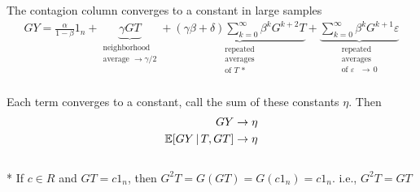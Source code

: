 \documentclass[aspectratio=169]{beamer}
\theoremstyle{remark}
\begin{document}
\begin{frame}{The contagion column converges to a constant in large samples}
    \begin{align*}
        GY = 
        \frac{\alpha}{1 - \beta} 1_n + 
        \underbrace{\gamma G T}_{\substack{\text{neighborhood}                                              \\ \text{average } \to \gamma / 2}} + 
        \underbrace{(\gamma \beta + \delta) \sum_{k=0}^\infty \beta^k G^{k+2} T}_{\substack{\text{repeated} \\ \text{averages} \\ \text{of $T$ *}}} +
        \underbrace{\sum_{k=0}^\infty \beta^k G^{k+1} \varepsilon}_{\substack{\text{repeated}               \\ \text{averages} \\ \text{of $\varepsilon$ } \to \, 0}}
    \end{align*} \\
    \vspace{4mm}
    Each term converges to a constant, call the sum of these constants $\eta$. Then
    \begin{align*}
        GY            & \to \eta   \\
        \E[T, GT]{GY} & \to \eta 
    \end{align*} \\
    \vspace{4mm}
    \footnotesize
    * If $c \in R$ and $GT = c 1_n$, then $G^2 T = G (GT) = G (c 1_n) = c 1_n$. i.e., $G^2 T = GT$
\end{frame}
\end{document}
